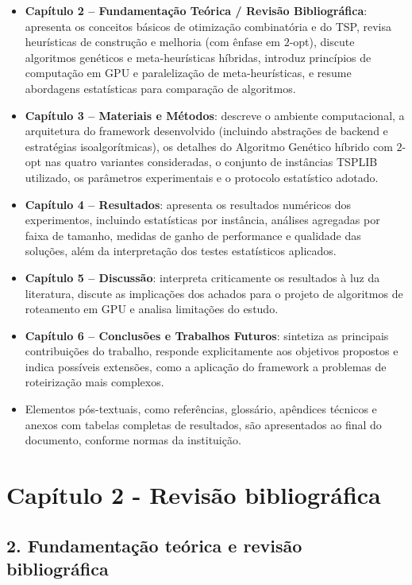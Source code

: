 \begin{itemize}
\tightlist
\item
  \textbf{Capítulo 2 -- Fundamentação Teórica / Revisão Bibliográfica}:
  apresenta os conceitos básicos de otimização combinatória e do TSP,
  revisa heurísticas de construção e melhoria (com ênfase em \(2\)-opt),
  discute algoritmos genéticos e meta-heurísticas híbridas, introduz
  princípios de computação em GPU e paralelização de meta-heurísticas, e
  resume abordagens estatísticas para comparação de algoritmos.
\item
  \textbf{Capítulo 3 -- Materiais e Métodos}: descreve o ambiente
  computacional, a arquitetura do framework desenvolvido (incluindo
  abstrações de backend e estratégias isoalgorítmicas), os detalhes do
  Algoritmo Genético híbrido com \(2\)-opt nas quatro variantes
  consideradas, o conjunto de instâncias TSPLIB utilizado, os parâmetros
  experimentais e o protocolo estatístico adotado.
\item
  \textbf{Capítulo 4 -- Resultados}: apresenta os resultados numéricos
  dos experimentos, incluindo estatísticas por instância, análises
  agregadas por faixa de tamanho, medidas de ganho de performance e
  qualidade das soluções, além da interpretação dos testes estatísticos
  aplicados.
\item
  \textbf{Capítulo 5 -- Discussão}: interpreta criticamente os
  resultados à luz da literatura, discute as implicações dos achados
  para o projeto de algoritmos de roteamento em GPU e analisa limitações
  do estudo.
\item
  \textbf{Capítulo 6 -- Conclusões e Trabalhos Futuros}: sintetiza as
  principais contribuições do trabalho, responde explicitamente aos
  objetivos propostos e indica possíveis extensões, como a aplicação do
  framework a problemas de roteirização mais complexos.
\item
  Elementos pós-textuais, como referências, glossário, apêndices
  técnicos e anexos com tabelas completas de resultados, são
  apresentados ao final do documento, conforme normas da instituição.
\end{itemize}

\section{Capítulo 2 - Revisão
bibliográfica}\label{cap2-revisao-bibliografica}

\subsection{2. Fundamentação teórica e revisão
bibliográfica}\label{sec-2-fundamentacao-e-revisao}

